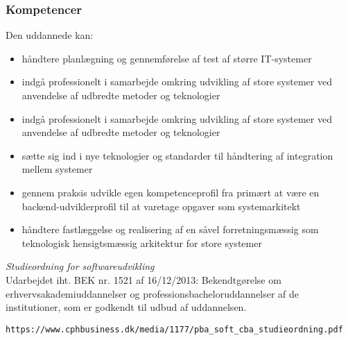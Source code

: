 \documentclass{article}
\begin{document}
\subsubsection{Kompetencer}
Den uddannede kan:
\begin{itemize}
    \item håndtere planlægning og gennemførelse af test af større IT-systemer
    \item indgå professionelt i samarbejde omkring udvikling af store systemer ved anvendelse af udbredte metoder og teknologier
    \item indgå professionelt i samarbejde omkring udvikling af store systemer ved anvendelse af udbredte metoder og teknologier
    \item sætte sig ind i nye teknologier og standarder til håndtering af integration mellem systemer
    \item gennem praksis udvikle egen kompetenceprofil fra primært at være en
    backend-udviklerprofil til at varetage opgaver som systemarkitekt
    \item håndtere fastlæggelse og realisering af en såvel forretningsmæssig som teknologisk hensigtsmæssig arkitektur for store systemer
\end{itemize} 


\begin{thebibliography}{9}
\textit{Studieordning for softwareudvikling} \\
Udarbejdet iht. BEK nr. 1521 af 16/12/2013: Bekendtgørelse om erhvervsakademiuddannelser og professionsbacheloruddannelser af de institutioner, som er godkendt til udbud af uddannelsen.

\texttt{https://www.cphbusiness.dk/media/1177/pba_soft_cba_studieordning.pdf}

\end{thebibliography}
\end{document}
